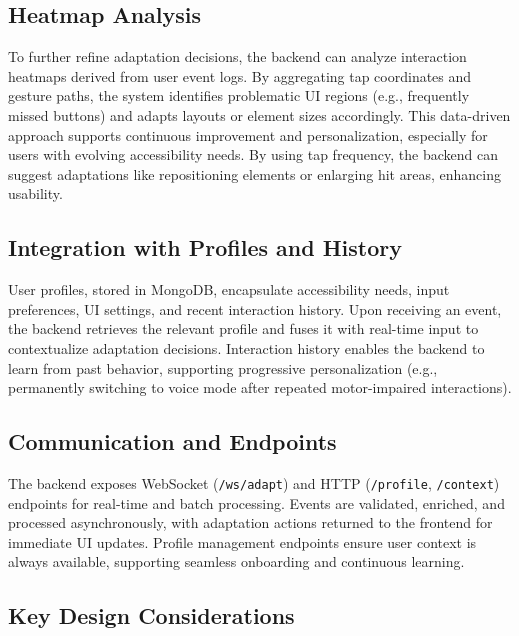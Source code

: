 \documentclass[openany]{book}
\begin{document}
\subsection{Heatmap Analysis}

To further refine adaptation decisions, the backend can analyze interaction heatmaps derived from user event logs. By aggregating tap coordinates and gesture paths, the system identifies problematic UI regions (e.g., frequently missed buttons) and adapts layouts or element sizes accordingly. This data-driven approach supports continuous improvement and personalization, especially for users with evolving accessibility needs. By using tap frequency, the backend can suggest adaptations like repositioning elements or enlarging hit areas, enhancing usability.

\subsection{Integration with Profiles and History}

User profiles, stored in MongoDB, encapsulate accessibility needs, input preferences, UI settings, and recent interaction history. Upon receiving an event, the backend retrieves the relevant profile and fuses it with real-time input to contextualize adaptation decisions. Interaction history enables the backend to learn from past behavior, supporting progressive personalization (e.g., permanently switching to voice mode after repeated motor-impaired interactions).

\subsection{Communication and Endpoints}

The backend exposes WebSocket (\texttt{/ws/adapt}) and HTTP (\texttt{/profile}, \texttt{/context}) endpoints for real-time and batch processing. Events are validated, enriched, and processed asynchronously, with adaptation actions returned to the frontend for immediate UI updates. Profile management endpoints ensure user context is always available, supporting seamless onboarding and continuous learning.

\subsection{Key Design Considerations}
\end{document}
